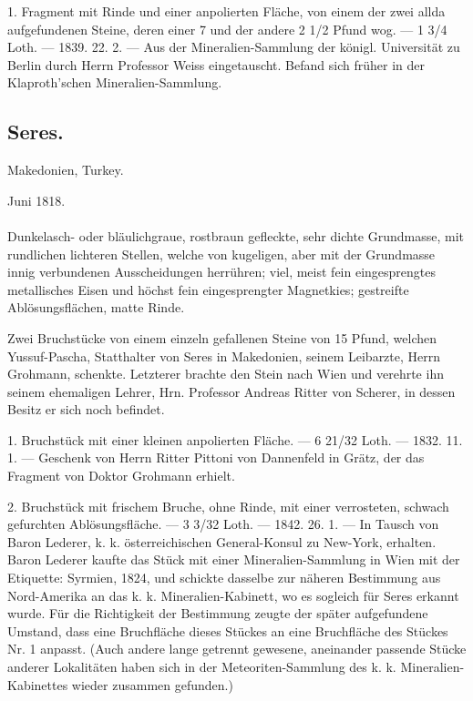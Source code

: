 \documentclass[a4paper, 11pt, oneside, polutonikogreek, german]{article}
\begin{document}
1. Fragment mit Rinde und einer anpolierten Fläche, von einem der zwei allda aufgefundenen Steine, deren einer 7 und der andere 2 1/2 Pfund wog. — 1 3/4 Loth. — 1839. 22. 2. — Aus der Mineralien-Sammlung der königl. Universität zu Berlin durch Herrn Professor Weiss eingetauscht. Befand sich früher in der Klaproth'schen Mineralien-Sammlung.
\subsection{Seres.}
\begin{center}
\small
Makedonien, Turkey.

Juni 1818.
\end{center}
\paragraph{}
Dunkelasch- oder bläulichgraue, rostbraun gefleckte, sehr dichte Grundmasse, mit rundlichen lichteren Stellen, welche von kugeligen, aber mit der Grundmasse innig verbundenen Ausscheidungen herrühren; viel, meist fein eingesprengtes metallisches Eisen und höchst fein eingesprengter Magnetkies; gestreifte Ablösungsflächen, matte Rinde.

Zwei Bruchstücke von einem einzeln gefallenen Steine von 15 Pfund, welchen Yussuf-Pascha, Statthalter von Seres in Makedonien, seinem Leibarzte, Herrn Grohmann, schenkte. Letzterer brachte den Stein nach Wien und verehrte ihn seinem ehemaligen Lehrer, Hrn. Professor Andreas Ritter von Scherer, in dessen Besitz er sich noch befindet.

1. Bruchstück mit einer kleinen anpolierten Fläche. — 6 21/32 Loth. — 1832. 11. 1. — Geschenk von Herrn Ritter Pittoni von Dannenfeld in Grätz, der das Fragment von Doktor Grohmann erhielt.

2. Bruchstück mit frischem Bruche, ohne Rinde, mit einer verrosteten, schwach gefurchten Ablösungsfläche. — 3 3/32 Loth. — 1842. 26. 1. — In Tausch von Baron Lederer, k. k. österreichischen General-Konsul zu New-York, erhalten. Baron Lederer kaufte das Stück mit einer Mineralien-Sammlung in Wien mit der Etiquette: Syrmien, 1824, und schickte dasselbe zur näheren Bestimmung aus Nord-Amerika an das k. k. Mineralien-Kabinett, wo es sogleich für Seres erkannt wurde. Für die Richtigkeit der Bestimmung zeugte der später aufgefundene Umstand, dass eine Bruchfläche dieses Stückes an eine Bruchfläche des Stückes Nr. 1 anpasst. (Auch andere lange getrennt gewesene, aneinander passende Stücke anderer Lokalitäten haben sich in der Meteoriten-Sammlung des k. k. Mineralien-Kabinettes wieder zusammen gefunden.)
\end{document}
